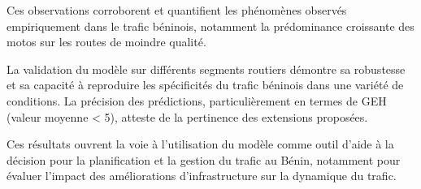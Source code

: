 Ces observations corroborent et quantifient les phénomènes observés empiriquement dans le trafic béninois, notamment la prédominance croissante des motos sur les routes de moindre qualité.

La validation du modèle sur différents segments routiers démontre sa robustesse et sa capacité à reproduire les spécificités du trafic béninois dans une variété de conditions. La précision des prédictions, particulièrement en termes de GEH (valeur moyenne < 5), atteste de la pertinence des extensions proposées.

Ces résultats ouvrent la voie à l'utilisation du modèle comme outil d'aide à la décision pour la planification et la gestion du trafic au Bénin, notamment pour évaluer l'impact des améliorations d'infrastructure sur la dynamique du trafic.
